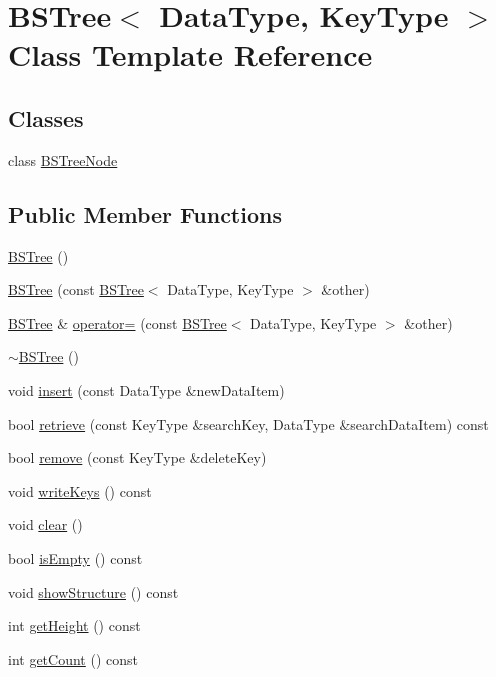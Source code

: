 \hypertarget{class_b_s_tree}{\section{B\+S\+Tree$<$ Data\+Type, Key\+Type $>$ Class Template Reference}
\label{class_b_s_tree}
}
\subsection*{Classes}
\begin{DoxyCompactItemize}
\item 
class \hyperlink{class_b_s_tree_1_1_b_s_tree_node}{B\+S\+Tree\+Node}
\end{DoxyCompactItemize}
\subsection*{Public Member Functions}
\begin{DoxyCompactItemize}
\item 
\hyperlink{class_b_s_tree_a4513fc6697f5e51bff8e7c448b446c9e}{B\+S\+Tree} ()
\item 
\hyperlink{class_b_s_tree_a6658391c178cb35858c9c465e1839fb0}{B\+S\+Tree} (const \hyperlink{class_b_s_tree}{B\+S\+Tree}$<$ Data\+Type, Key\+Type $>$ \&other)
\item 
\hyperlink{class_b_s_tree}{B\+S\+Tree} \& \hyperlink{class_b_s_tree_ac36b0b564aa3c411c239d730f506f448}{operator=} (const \hyperlink{class_b_s_tree}{B\+S\+Tree}$<$ Data\+Type, Key\+Type $>$ \&other)
\item 
\hyperlink{class_b_s_tree_a968c51c539f4ae41357c78b6a60fea4c}{$\sim$\+B\+S\+Tree} ()
\item 
void \hyperlink{class_b_s_tree_ab86b4cea496ee53076021126423d51fd}{insert} (const Data\+Type \&new\+Data\+Item)
\item 
bool \hyperlink{class_b_s_tree_a4359bfee390669b5adaf0380ef62b18d}{retrieve} (const Key\+Type \&search\+Key, Data\+Type \&search\+Data\+Item) const 
\item 
bool \hyperlink{class_b_s_tree_a755549f7b88d0178a96ca84afd5e04cf}{remove} (const Key\+Type \&delete\+Key)
\item 
void \hyperlink{class_b_s_tree_a7f08f48e6d1bbe3eb726856a947325e7}{write\+Keys} () const 
\item 
void \hyperlink{class_b_s_tree_a926822d08f3d0321603f9fafd2254b16}{clear} ()
\item 
bool \hyperlink{class_b_s_tree_a43768375369ca8fe641a86451997ad45}{is\+Empty} () const 
\item 
void \hyperlink{class_b_s_tree_ac28277cacbf8ab33326473a419abf097}{show\+Structure} () const 
\item 
int \hyperlink{class_b_s_tree_a3850adc6b8ae965ec11ec0e0567b6f7d}{get\+Height} () const 
\item 
int \hyperlink{class_b_s_tree_a880d98553153533d3c29504e8a272c7d}{get\+Count} () const 
\end{DoxyCompactItemize}
